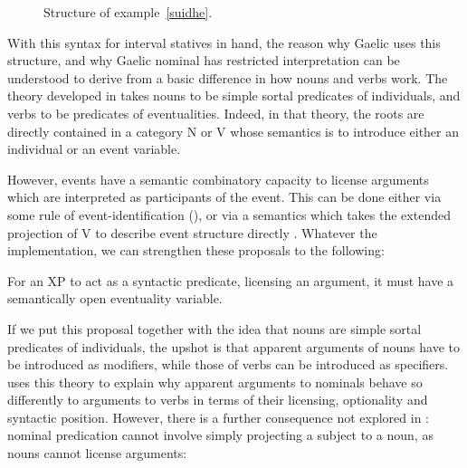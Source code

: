 \documentclass[output=paper]{langsci/langscibook}
\begin{document}
\begin{figure}
\caption{Structure of example~\eqref{suidhe}.\label{suidhetree}}
\end{figure}

With this syntax for interval statives in hand, the reason why Gaelic uses this
structure, and why Gaelic nominal  has restricted interpretation can
be understood to derive from a basic difference in how nouns and verbs work.
The theory developed in \citet{adgerbook} takes nouns to be simple sortal
predicates of individuals, and verbs to be predicates of eventualities. Indeed,
in that theory, the roots are directly contained in a category N or V whose
semantics is to introduce either an individual or an event variable.

{\sloppy
However, events have a semantic combinatory capacity to license arguments which
are interpreted as participants of the event. This can be done either via some
rule of event-identification (\citealt{kratzer96}), or via a semantics which
takes the extended projection of V to describe event structure
directly \parencite{ramchand08}. Whatever the implementation, we can strengthen
these proposals to the following:}

\ea For an XP to act as a syntactic predicate, licensing an argument, it must
have a semantically open eventuality variable. \z

If we put this proposal together with the idea that nouns are simple sortal
predicates of individuals, the upshot is that apparent arguments of nouns have
to be introduced as modifiers, while those of verbs can be introduced as
specifiers. \textcite{adgerbook} uses this theory to explain why apparent
arguments to nominals behave so differently to arguments to verbs in terms of
their licensing, optionality and syntactic position. However, there is a
further consequence not explored in \citet{adgerbook}: nominal predication
cannot involve simply projecting a subject to a noun, as nouns cannot license
arguments:
\end{document}

